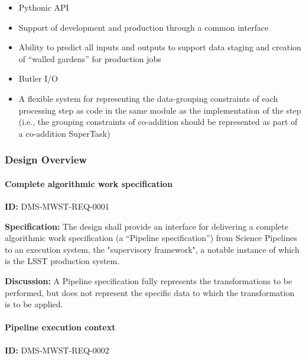 \documentclass[SE,toc,lsstdraft]{lsstdoc}
\begin{document}
    \begin{itemize}
\item
Pythonic API

\item
Support of development and production through a common interface

\item
Ability to predict all inputs and outputs to support data staging and creation of “walled gardens” for production jobs

\item
Butler I/O

\item
A flexible system for representing the data-grouping constraints of each processing step as code in the same module as the implementation of the step (i.e., the grouping constraints of co-addition should be represented as part of a co-addition SuperTask)

    \end{itemize}

\subsubsection{Design Overview}

\paragraph{Complete algorithmic work specification}\hfill  %

\label{DMS-MWST-REQ-0001}
\textbf{ID:} DMS-MWST-REQ-0001

\textbf{Specification:}
The design shall provide an interface for delivering a complete algorithmic work specification (a “Pipeline specification”) from Science Pipelines to an execution system, the "supervisory framework", a notable instance of which is the LSST production system.

\textbf{Discussion:}
A Pipeline specification fully represents the transformations to be performed, but does not represent the specific data to which the transformation is to be applied.

\paragraph{Pipeline execution context}\hfill  %

\label{DMS-MWST-REQ-0002}
\textbf{ID:} DMS-MWST-REQ-0002
\end{document}
